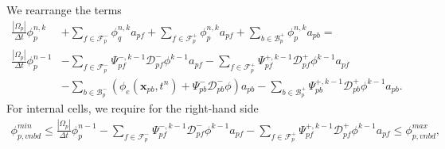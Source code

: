 \documentclass[../thesis.tex]{subfiles}
\begin{document}
We rearrange the terms
\begin{equation}
	\begin{split}
		\frac{|\Omega_p|}{\Delta t}\phi^{n,k}_p
		&+ \sum_{f \in \mathcal{F}_p^-}
		\phi_q^{n,k} a_{pf}
		+ \sum_{f \in \mathcal{F}_p^+}
		\phi_p^{n,k} a_{pf}
		+ \sum_{b \in \mathcal{B}_p^+}
		\phi_p^{n,k} a_{pb}
		=\\
		\frac{|\Omega_p|}{\Delta t}\phi_p^{n-1}
		&-\sum_{f \in \mathcal{F}_p^-}
		\Psi_{pf}^{-, k-1}\mathcal{D}^-_{pf}\phi^{k-1}  a_{pf}
		- \sum_{f \in \mathcal{F}_p^+}
		\Psi_{pf}^{+, k-1}\mathcal{D}^+_{pf}\phi^{k-1}  a_{pf}
		\\
		&-\sum_{b \in \mathcal{B}_p^-}
		\left(
			\phi_e(\boldsymbol{x}_{pb}, t^{n})
			+ \Psi_{pb}^-\mathcal{D}^-_{pb}\phi
		\right) a_{pb}
		- \sum_{b \in \mathcal{B}_p^+}
		\Psi_{pb}^{+, k-1}\mathcal{D}^+_{pb}\phi^{k-1} a_{pb}.
	\end{split}
\end{equation}
For internal cells, we require for the right-hand side
\begin{equation*}
	\begin{split}
		\phi_{p, vnbd}^{min}
		\leq
		\frac{|\Omega_p|}{\Delta t}\phi_p^{n-1}
		- \sum_{f \in \mathcal{F}_p^-}
		\Psi_{pf}^{-,k-1}\mathcal{D}^-_{pf}\phi^{k-1} a_{pf}
		- \sum_{f \in \mathcal{F}_p^+}
		\Psi_{pf}^{+,k-1}\mathcal{D}^+_{pf}\phi^{k-1} a_{pf}
		\leq
		\phi_{p, vnbd}^{max},
	\end{split}
\end{equation*}
\end{document}
